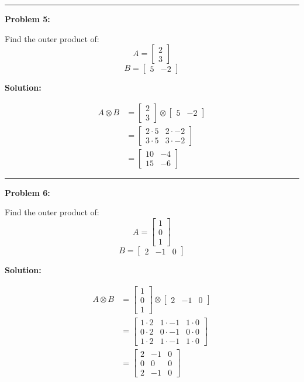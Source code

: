 \documentclass[
  letterpaper,
  DIV=11,
  numbers=noendperiod]{scrreprt}
\theoremstyle{plain}
\theoremstyle{definition}
\theoremstyle{remark}
\begin{document}
\begin{center}\rule{0.5\linewidth}{0.5pt}\end{center}

\textbf{Problem 5:}

Find the outer product of: \[A=\begin{bmatrix}2\\3\end{bmatrix}\]
\[B=\begin{bmatrix}5&-2\end{bmatrix}\]

\textbf{Solution:}

\begin{align*}
A \otimes B &= \begin{bmatrix}2\\3\end{bmatrix} \otimes \begin{bmatrix}5&-2\end{bmatrix} \\
&= \begin{bmatrix}
2 \cdot 5 & 2 \cdot -2 \\
3 \cdot 5 & 3 \cdot -2
\end{bmatrix} \\
&= \begin{bmatrix}
10 & -4 \\
15 & -6
\end{bmatrix}
\end{align*}

\begin{center}\rule{0.5\linewidth}{0.5pt}\end{center}

\textbf{Problem 6:}

Find the outer product of: \[A=\begin{bmatrix}1\\0\\1\end{bmatrix}\]
\[B=\begin{bmatrix}2&-1&0\end{bmatrix}\]

\textbf{Solution:}

\begin{align*}
A \otimes B &= \begin{bmatrix}1\\0\\1\end{bmatrix} \otimes \begin{bmatrix}2&-1&0\end{bmatrix} \\
&= \begin{bmatrix}
1 \cdot 2 & 1 \cdot -1 & 1 \cdot 0 \\
0 \cdot 2 & 0 \cdot -1 & 0 \cdot 0 \\
1 \cdot 2 & 1 \cdot -1 & 1 \cdot 0
\end{bmatrix} \\
&= \begin{bmatrix}
2 & -1 & 0 \\
0 & 0 & 0 \\
2 & -1 & 0
\end{bmatrix}
\end{align*}
\end{document}

